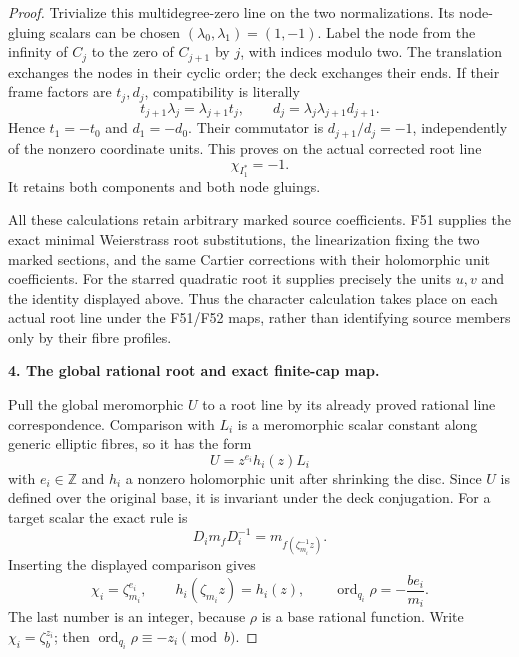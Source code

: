 \begin{proof}
Trivialize this multidegree-zero line on the two normalizations.
Its node-gluing scalars can be chosen \((\lambda_0,\lambda_1)
=(1,-1)\). Label the node from the infinity of \(C_j\) to
the zero of \(C_{j+1}\) by \(j\), with indices modulo two.
The translation exchanges the nodes in their cyclic order;
the deck exchanges their ends. If their frame factors are
\(t_j,d_j\), compatibility is literally
\[
 t_{j+1}\lambda_j=\lambda_{j+1}t_j,\qquad
 d_j=\lambda_j\lambda_{j+1}d_{j+1}.
\]
Hence \(t_1=-t_0\) and \(d_1=-d_0\). Their commutator is
\(d_{j+1}/d_j=-1\), independently of the nonzero coordinate
units. This proves on the actual corrected root line
\[
                         \chi_{I_1^*}=-1.              \tag{P3K.35.12}
\]
It retains both components and both node gluings.

All these calculations retain arbitrary marked source coefficients.
F51 supplies the exact minimal Weierstrass root substitutions,
the linearization fixing the two marked sections, and the same
Cartier corrections with their holomorphic unit coefficients.
For the starred quadratic root it supplies precisely the units
\(u,v\) and the identity displayed above. Thus the character
calculation takes place on each actual root line under the F51/F52
maps, rather than identifying source members only by their fibre
profiles.

\par\medskip\noindent\textbf{4. The global rational root and exact finite-cap map.}\enspace

Pull the global meromorphic \(U\) to a root line by its already
proved rational line correspondence. Comparison with \(L_i\)
is a meromorphic scalar constant along generic elliptic fibres,
so it has the form
\[
                          U=z^{e_i}h_i(z)L_i
\]
with \(e_i\in\mathbb Z\) and \(h_i\) a nonzero holomorphic
unit after shrinking the disc. Since \(U\) is defined over
the original base, it is invariant under the deck conjugation.
For a target scalar the exact rule is
\[
 D_i m_f D_i^{-1}=m_{f(\zeta_{m_i}^{-1}z)}.
\]
Inserting the displayed comparison gives
\[
 \chi_i=\zeta_{m_i}^{e_i},\qquad
 h_i(\zeta_{m_i}z)=h_i(z),\qquad
 \operatorname{ord}_{q_i}\rho=-\frac{be_i}{m_i}.        \tag{P3K.35.13}
\]
The last number is an integer, because \(\rho\) is a base
rational function. Write \(\chi_i=\zeta_b^{z_i}\); then
\(\operatorname{ord}_{q_i}\rho\equiv-z_i\pmod b\).


\end{proof}
